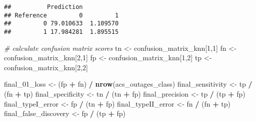 \documentclass[
]{article}
\newenvironment{Shaded}{\begin{snugshade}}{\end{snugshade}}
\newcommand{\CommentTok}[1]{\textcolor[rgb]{0.56,0.35,0.01}{\textit{#1}}}
\newcommand{\DecValTok}[1]{\textcolor[rgb]{0.00,0.00,0.81}{#1}}
\newcommand{\KeywordTok}[1]{\textcolor[rgb]{0.13,0.29,0.53}{\textbf{#1}}}
\newcommand{\NormalTok}[1]{#1}
\newcommand{\OperatorTok}[1]{\textcolor[rgb]{0.81,0.36,0.00}{\textbf{#1}}}
\newcommand{\StringTok}[1]{\textcolor[rgb]{0.31,0.60,0.02}{#1}}
\begin{document}
\begin{verbatim}
##          Prediction
## Reference         0         1
##         0 79.010633  1.109570
##         1 17.984281  1.895515
\end{verbatim}

\begin{Shaded}
\begin{Highlighting}[]
\CommentTok{# calculate confusion matrix scores}
\NormalTok{tn <-}\StringTok{ }\NormalTok{confusion_matrix_knn[}\DecValTok{1}\NormalTok{,}\DecValTok{1}\NormalTok{]}
\NormalTok{fn <-}\StringTok{ }\NormalTok{confusion_matrix_knn[}\DecValTok{2}\NormalTok{,}\DecValTok{1}\NormalTok{]}
\NormalTok{fp <-}\StringTok{ }\NormalTok{confusion_matrix_knn[}\DecValTok{1}\NormalTok{,}\DecValTok{2}\NormalTok{]}
\NormalTok{tp <-}\StringTok{ }\NormalTok{confusion_matrix_knn[}\DecValTok{2}\NormalTok{,}\DecValTok{2}\NormalTok{]}

\NormalTok{final_}\DecValTok{01}\NormalTok{_loss <-}\StringTok{ }\NormalTok{(fp }\OperatorTok{+}\StringTok{ }\NormalTok{fn) }\OperatorTok{/}\StringTok{ }\KeywordTok{nrow}\NormalTok{(acs_outages_class)}
\NormalTok{final_sensitivity <-}\StringTok{ }\NormalTok{tp }\OperatorTok{/}\StringTok{ }\NormalTok{(fn }\OperatorTok{+}\StringTok{ }\NormalTok{tp)}
\NormalTok{final_specificity <-}\StringTok{ }\NormalTok{tn }\OperatorTok{/}\StringTok{ }\NormalTok{(tn }\OperatorTok{+}\StringTok{ }\NormalTok{fp)}
\NormalTok{final_precision <-}\StringTok{ }\NormalTok{tp }\OperatorTok{/}\StringTok{ }\NormalTok{(tp }\OperatorTok{+}\StringTok{ }\NormalTok{fp)}
\NormalTok{final_typeI_error <-}\StringTok{ }\NormalTok{fp }\OperatorTok{/}\StringTok{ }\NormalTok{(tn }\OperatorTok{+}\StringTok{ }\NormalTok{fp)}
\NormalTok{final_typeII_error <-}\StringTok{ }\NormalTok{fn }\OperatorTok{/}\StringTok{ }\NormalTok{(fn }\OperatorTok{+}\StringTok{ }\NormalTok{tp)}
\NormalTok{final_false_discovery <-}\StringTok{ }\NormalTok{fp }\OperatorTok{/}\StringTok{ }\NormalTok{(tp }\OperatorTok{+}\StringTok{ }\NormalTok{fp)}
\end{Highlighting}
\end{Shaded}
\end{document}
